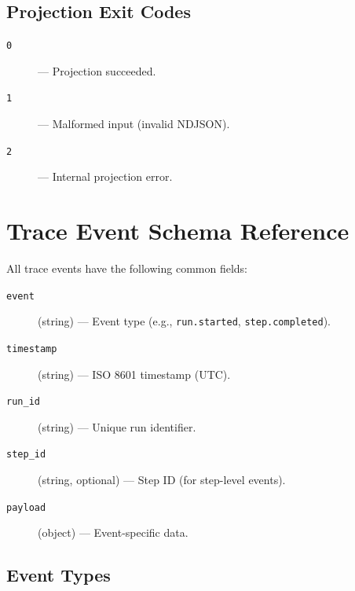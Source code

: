 \subsection{Projection Exit Codes}

\begin{description}
  \item[\texttt{0}] --- Projection succeeded.
  \item[\texttt{1}] --- Malformed input (invalid NDJSON).
  \item[\texttt{2}] --- Internal projection error.
\end{description}

\section{Trace Event Schema Reference}
\label{sec:trace-event-schema}

All trace events have the following common fields:

\begin{description}
  \item[\texttt{event}] (string) --- Event type (e.g., \texttt{run.started},
    \texttt{step.completed}).
  \item[\texttt{timestamp}] (string) --- ISO 8601 timestamp (UTC).
  \item[\texttt{run\_id}] (string) --- Unique run identifier.
  \item[\texttt{step\_id}] (string, optional) --- Step ID (for step-level events).
  \item[\texttt{payload}] (object) --- Event-specific data.
\end{description}

\subsection{Event Types}

